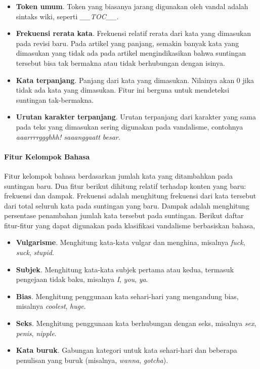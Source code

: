 \documentclass[12pt,a4paper,titlepage]{article}
\begin{document}
\begin{itemize}
\item \textbf{Token umum}.
Token yang biasanya jarang digunakan oleh vandal adalah sintaks wiki, seperti \textit{\_\_TOC\_\_}.

\item \textbf{Frekuensi rerata kata}.
Frekuensi relatif rerata dari kata yang dimasukan pada revisi baru.
Pada artikel yang panjang, semakin banyak kata yang dimasukan yang tidak ada pada artikel mengindikasikan bahwa suntingan tersebut bisa tak bermakna atau tidak berhubungan dengan isinya.

\item \textbf{Kata terpanjang}.
Panjang dari kata yang dimasukan.
Nilainya akan 0 jika tidak ada kata yang dimasukan.
Fitur ini berguna untuk mendeteksi suntingan tak-bermakna.

\item \textbf{Urutan karakter terpanjang}.
Urutan terpanjang dari karakter yang sama pada teks yang dimasukan sering digunakan pada vandalisme, contohnya \textit{aaarrrrggghhh! saaanggaatt besar}.

\end{itemize}

\paragraph{Fitur Kelompok Bahasa}

Fitur kelompok bahasa berdasarkan jumlah kata yang ditambahkan pada suntingan baru.
Dua fitur berikut dihitung relatif terhadap konten yang baru: frekuensi dan dampak.
Frekuensi adalah menghitung frekuensi dari kata tersebut dari total seluruh kata pada suntingan yang baru.
Dampak adalah menghitung persentase penambahan jumlah kata tersebut pada suntingan.
Berikut daftar fitur-fitur yang dapat digunakan pada klasifikasi vandalisme berbasiskan bahasa,

\begin{itemize}
\item \textbf{Vulgarisme}.
Menghitung kata-kata vulgar dan menghina, misalnya \textit{fuck}, \textit{suck}, \textit{stupid}.

\item \textbf{Subjek}.
Menghitung kata-kata subjek pertama atau kedua, termasuk pengejaan tidak baku, misalnya \textit{I}, \textit{you}, \textit{ya}.

\item \textbf{Bias}.
Menghitung penggunaan kata sehari-hari yang mengandung bias, misalnya \textit{coolest}, \textit{huge}.

\item \textbf{Seks}.
Menghitung penggunaan kata berhubungan dengan seks, misalnya \textit{sex}, \textit{penis}, \textit{nipple}.

\item \textbf{Kata buruk}.
Gabungan kategori untuk kata sehari-hari dan beberapa penulisan yang buruk (misalnya, \textit{wanna}, \textit{gotcha}).

\end{itemize}
\end{document}
